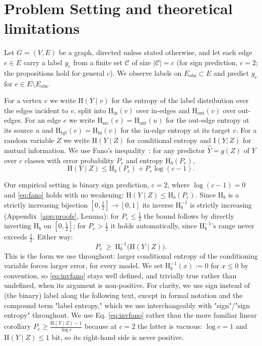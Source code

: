 \documentclass[sigconf, review, anonymous]{acmart}
\newcommand{\Hh}{\mathrm{H}}
\newcommand{\MI}{\mathrm{I}}
\newcommand{\indeg}{\mathrm{in}}
\newcommand{\outdeg}{\mathrm{out}}
\theoremstyle{plain}
\theoremstyle{definition}
\begin{document}
\section{Problem Setting and theoretical limitations}
\label{sec:notation}
Let $G=(V,E)$ be a graph, directed unless stated otherwise, and let each edge $e\in E$ carry a label $y_e$ from a finite set $\mathcal{C}$ of size $|\mathcal{C}|=c$ (for sign prediction, $c=2$; the propositions hold for general $c$). We observe labels on $E_{\mathrm{obs}}\subset E$ and predict $y_e$ for $e\in E\setminus E_{\mathrm{obs}}$.

\label{def:vertex-entropy}For a vertex $v$ we write $\Hh(Y\mid v)$ for the entropy of the label distribution over the edges incident to $v$, split into $\Hh_\indeg(v)$ over in-edges and $\Hh_\outdeg(v)$ over out-edges. For an edge $e$ we write $\Hh_{\mathrm{src}}(e)=\Hh_\outdeg(u)$ for the out-edge entropy at its source $u$ and $\Hh_{\mathrm{tgt}}(e)=\Hh_\indeg(v)$ for the in-edge entropy at its target $v$. For a random variable $Z$ we write $\Hh(Y\mid Z)$ for conditional entropy and $\MI(Y;Z)$ for mutual information. We use Fano's inequality~\citep{cover2006elements}: for any predictor $\hat Y=g(Z)$ of $Y$ over $c$ classes with error probability $P_e$ and entropy $\Hh_b(P_e)$,
\begin{equation}
\Hh(Y\mid Z)\le \Hh_b(P_e)+P_e\log(c-1).
\label{eq:fano}
\end{equation}

Our empirical setting is binary sign prediction, $c=2$, where $\log(c-1)=0$ and \eqref{eq:fano} holds with no weakening: $\Hh(Y\mid Z)\le \Hh_b(P_e)$. Since $\Hh_b$ is a strictly increasing bijection $[0,\tfrac12]\to[0,1]$ its inverse $\Hh_b^{-1}$ is strictly increasing (Appendix~\ref{app:proofs}, Lemma): for $P_e\le\tfrac12$ the bound follows by directly inverting $\Hh_b$ on $[0,\tfrac12]$; for $P_e>\tfrac12$ it holds automatically, since $\Hh_b^{-1}$'s range never exceeds $\tfrac12$. Either way:
\begin{equation}
P_e\ \ge\ \Hh_b^{-1}\big(\Hh(Y\mid Z)\big).
\label{eq:invfano}
\end{equation}
This is the form we use throughout: larger conditional entropy of the conditioning variable forces larger error, for every model. We set $\Hh_b^{-1}(x):=0$ for $x\le 0$ by convention, so \eqref{eq:invfano} stays well defined, and trivially true rather than undefined, when its argument is non-positive. For clarity, we use sign instead of (the binary) label along the following text, except in formal notation and the compound term "label entropy," which we use interchangeably with "sign"/"sign entropy" throughout. We use Eq. \eqref{eq:invfano} rather than the more familiar linear corollary $P_e\ge\frac{\Hh(Y\mid Z)-1}{\log c}$ because at $c=2$ the latter is vacuous: $\log c=1$ and $\Hh(Y\mid Z)\le 1$ bit, so its right-hand side is never positive. 
\end{document}
